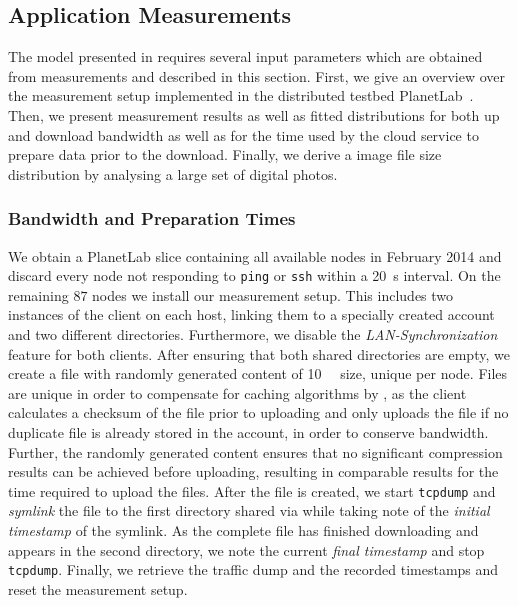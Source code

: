 \subsection{Application Measurements}\label{sec:application:cloud_file_synchronisation:application_measurements}
The model presented in  requires several input parameters which are obtained from measurements and described in this section.
First, we give an overview over the measurement setup implemented in the distributed testbed PlanetLab~\cite{Chun2003}.
Then, we present measurement results as well as fitted distributions for both up and download bandwidth as well as for the time used by the cloud service to prepare data prior to the download.
Finally, we derive a image file size distribution by analysing a large set of digital photos.

\subsubsection*{Bandwidth and Preparation Times}\label{sec:application:cloud_file_synchronisation:application_measurements:bandwidth_preparation_times}
We obtain a PlanetLab slice containing all available nodes in February 2014 and discard every node not responding to \texttt{ping} or \texttt{ssh} within a \SI{20}{\second} interval.
On the remaining \(87\) nodes we install our measurement setup.
This includes two instances of the \dropbox client on each host, linking them to a specially created \dropbox account and two different directories.
Furthermore, we disable the \emph{LAN-Synchronization} feature for both clients.
After ensuring that both shared directories are empty, we create a file with randomly generated content of \SI{10}{\mega\bit} size, unique per node.
Files are unique in order to compensate for caching algorithms by \dropbox, as the client calculates a checksum of the file prior to uploading and only uploads the file if no duplicate file is already stored in the account, in order to conserve bandwidth.
Further, the randomly generated content ensures that no significant compression results can be achieved before uploading, resulting in comparable results for the time required to upload the files.
After the file is created, we start \texttt{tcpdump} and \emph{symlink} the file to the first directory shared via \dropbox while taking note of the \emph{initial timestamp} of the symlink.
As the complete file has finished downloading and appears in the second \dropbox directory, we note the current \emph{final timestamp} and stop \texttt{tcpdump}.
Finally, we retrieve the traffic dump and the recorded timestamps and reset the measurement setup.

